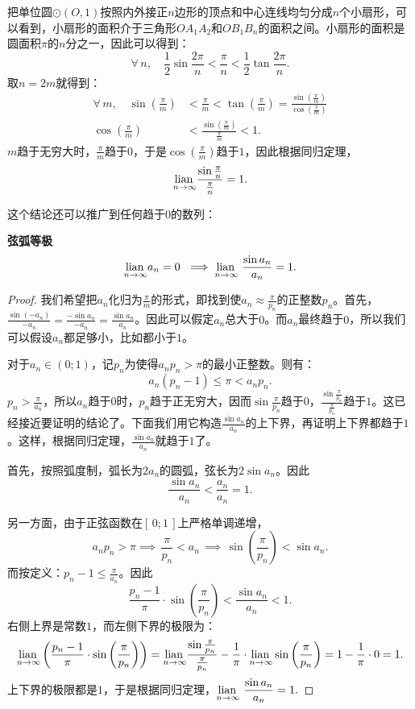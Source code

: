 \documentclass[12pt,UTF8]{ctexbook}
\begin{document}
把单位圆$\odot(O,1)$按照内外接正$n$边形的顶点和中心连线均匀分成$n$个小扇形，可以看到，小扇形的面积介于三角形$OA_1A_2$和$OB_1B_n$的面积之间。小扇形的面积是圆面积$\pi$的$n$分之一，因此可以得到：
$$ \forall \,n,\quad \frac{1}{2}\sin{\frac{2\pi}{n}} < \frac{\pi}{n} < \frac{1}{2}\tan{\frac{2\pi}{n}}. $$
取$n = 2m$就得到：
\begin{align*}
    \forall \,m,\quad \sin{\left(\frac{\pi}{m}\right)} &< \frac{\pi}{m} < \tan{\left(\frac{\pi}{m}\right)} = \frac{\sin{\left(\frac{\pi}{m}\right)}}{\cos{\left(\frac{\pi}{m}\right)}} \\
    \cos{\left(\frac{\pi}{m}\right)} &< \frac{\sin{\left(\frac{\pi}{m}\right)}}{\frac{\pi}{m}} < 1.
\end{align*}
$m$趋于无穷大时，$\frac{\pi}{m}$趋于$0$，于是$\cos{\left(\frac{\pi}{m}\right)}$趋于$1$，因此根据同归定理，
$$ \underset{n\to\infty}{\operatorname{lian}\,} \frac{\sin{\frac{\pi}{n}}}{\frac{\pi}{n}} = 1. $$

这个结论还可以推广到任何趋于$0$的数列：
\begin{tm}{\textbf{弦弧等极}}
    $$\underset{n\to\infty}{\operatorname{lian}\,} a_n = 0 \,\,\implies \underset{n\to\infty}{\operatorname{lian}\,} \,\,\frac{\sin{a_n}}{a_n} = 1. $$
\end{tm}

\begin{proof}
    我们希望把$a_n$化归为$\frac{\pi}{m}$的形式，即找到使$a_n\approx \frac{\pi}{p_n}$的正整数$p_n$。首先，$\frac{\sin{(-a_n)}}{-a_n} = \frac{-\sin{a_n}}{-a_n} = \frac{\sin{a_n}}{a_n}$。因此可以假定$a_n$总大于$0$。而$a_n$最终趋于$0$，所以我们可以假设$a_n$都足够小，比如都小于$1$。

    对于$a_n\in(0;1)$，记$p_n$为使得$a_n p_n > \pi$的最小正整数。则有：
    $$ a_n(p_n - 1) \leqslant \pi < a_np_n. $$
    $p_n > \frac{\pi}{a_n}$，所以$a_n$趋于$0$时，$p_n$趋于正无穷大，因而$\sin{\frac{\pi}{p_n}}$趋于$0$，$\frac{\sin{\frac{\pi}{p_n}}}{\frac{\pi}{p_n}}$趋于$1$。这已经接近要证明的结论了。下面我们用它构造$\frac{\sin{a_n}}{a_n}$的上下界，再证明上下界都趋于$1$。这样，根据同归定理，$\frac{\sin{a_n}}{a_n}$就趋于$1$了。
    
    首先，按照弧度制，弧长为$2a_n$的圆弧，弦长为$2\sin{a_n}$。因此
    $$\frac{\sin{a_n}}{a_n} < \frac{a_n}{a_n} = 1.$$

    另一方面，由于正弦函数在$[\,0;1\,]$上严格单调递增，
    $$a_n p_n > \pi \implies \,\frac{\pi}{p_n} < a_n  \,\implies \,\sin{\left(\frac{\pi}{p_n}\right)} < \sin{a_n}. $$
    而按定义：$p_n - 1 \leqslant \frac{\pi}{a_n}$。因此
    $$ \frac{p_n - 1}{\pi}\cdot\sin{\left(\frac{\pi}{p_n}\right)} < \frac{\sin{a_n}}{a_n} < 1.$$
    右侧上界是常数$1$，而左侧下界的极限为：
    $$ \underset{n\to\infty}{\operatorname{lian}\,}\left(\frac{p_n - 1}{\pi}\cdot\sin{\left(\frac{\pi}{p_n}\right)}\right) = \underset{n\to\infty}{\operatorname{lian}\,}\frac{\sin{\frac{\pi}{p_n}}}{\frac{\pi}{p_n}} - \frac{1}{\pi}\cdot\underset{n\to\infty}{\operatorname{lian}\,}\sin{\left(\frac{\pi}{p_n}\right)} = 1 - \frac{1}{\pi}\cdot 0 = 1.$$
    上下界的极限都是$1$，于是根据同归定理，$\displaystyle \underset{n\to\infty}{\operatorname{lian}\,} \,\,\frac{\sin{a_n}}{a_n} = 1.$
\end{proof}
\end{document}
